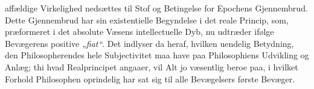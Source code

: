\documentclass[12pt]{book}
\begin{document}
affældige Virkelighed nedsættes til Stof og Betingelse for Epochens Gjennembrud. Dette
Gjennembrud har sin existentielle Begyndelse i det reale Princip, som, præformeret i
det absolute Væsens intellectuelle Dyb, nu udtræder ifølge Bevægerens positive
\textit{„fiat“}. Det indlyser da heraf, hvilken uendelig Betydning, den
Philosopherendes hele Subjectivitet maa have paa Philosophiens Udvikling og Anlæg; thi
hvad Realprincipet angaaer, vil Alt jo væsentlig beroe paa, i hvilket Forhold
Philosophen oprindelig har sat sig til alle Bevægelsers første Bevæger.
\end{document}
